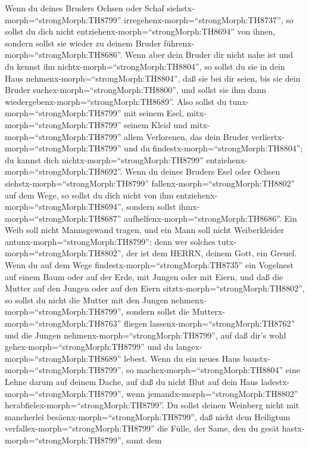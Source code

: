  Wenn du deines Bruders Ochsen oder Schaf
siehstx-morph=``strongMorph:TH8799''
irregehenx-morph=``strongMorph:TH8737'', so sollst du dich nicht
entziehenx-morph=``strongMorph:TH8694'' von ihnen, sondern sollst sie
wieder zu deinem Bruder führenx-morph=``strongMorph:TH8686''.
 Wenn aber dein Bruder dir nicht nahe ist und du kennst ihn
nichtx-morph=``strongMorph:TH8804'', so sollst du sie in dein Haus
nehmenx-morph=``strongMorph:TH8804'', daß sie bei dir seien, bis sie
dein Bruder suchex-morph=``strongMorph:TH8800'', und sollst sie ihm dann
wiedergebenx-morph=``strongMorph:TH8689''.  Also sollst du
tunx-morph=``strongMorph:TH8799'' mit seinem Esel,
mitx-morph=``strongMorph:TH8799'' seinem Kleid und
mitx-morph=``strongMorph:TH8799'' allem Verlorenen, das dein Bruder
verliertx-morph=``strongMorph:TH8799'' und du
findestx-morph=``strongMorph:TH8804''; du kannst dich
nichtx-morph=``strongMorph:TH8799''
entziehenx-morph=``strongMorph:TH8692''.  Wenn du deines
Bruders Esel oder Ochsen siehstx-morph=``strongMorph:TH8799''
fallenx-morph=``strongMorph:TH8802'' auf dem Wege, so sollst du dich
nicht von ihm entziehenx-morph=``strongMorph:TH8694'', sondern sollst
ihmx-morph=``strongMorph:TH8687''
aufhelfenx-morph=``strongMorph:TH8686''.  Ein Weib soll
nicht Mannsgewand tragen, und ein Mann soll nicht Weiberkleider
antunx-morph=``strongMorph:TH8799''; denn wer solches
tutx-morph=``strongMorph:TH8802'', der ist dem HERRN, deinem Gott, ein
Greuel.  Wenn du auf dem Wege
findestx-morph=``strongMorph:TH8735'' ein Vogelnest auf einem Baum oder
auf der Erde, mit Jungen oder mit Eiern, und daß die Mutter auf den
Jungen oder auf den Eiern sitztx-morph=``strongMorph:TH8802'', so sollst
du nicht die Mutter mit den Jungen nehmenx-morph=``strongMorph:TH8799'',
 sondern sollst die Mutterx-morph=``strongMorph:TH8763''
fliegen lassenx-morph=``strongMorph:TH8762'' und die Jungen
nehmenx-morph=``strongMorph:TH8799'', auf daß dir's wohl
gehex-morph=``strongMorph:TH8799'' und du
langex-morph=``strongMorph:TH8689'' lebest.  Wenn du ein
neues Haus baustx-morph=``strongMorph:TH8799'', so
machex-morph=``strongMorph:TH8804'' eine Lehne darum auf deinem Dache,
auf daß du nicht Blut auf dein Haus
ladestx-morph=``strongMorph:TH8799'', wenn
jemandx-morph=``strongMorph:TH8802''
herabfielex-morph=``strongMorph:TH8799''.  Du sollst deinen
Weinberg nicht mit mancherlei besäenx-morph=``strongMorph:TH8799'', daß
nicht dem Heiligtum verfallex-morph=``strongMorph:TH8799'' die Fülle,
der Same, den du gesät hastx-morph=``strongMorph:TH8799'', samt dem
